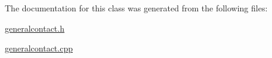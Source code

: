The documentation for this class was generated from the following files\-:\begin{DoxyCompactItemize}
\item 
\hyperlink{generalcontact_8h}{generalcontact.\-h}\item 
\hyperlink{generalcontact_8cpp}{generalcontact.\-cpp}\end{DoxyCompactItemize}

